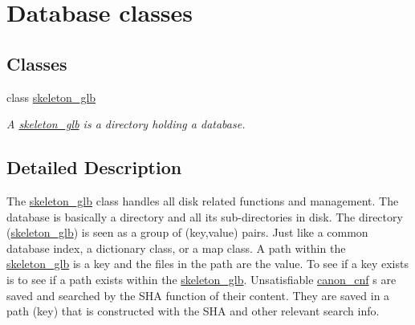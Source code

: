 \hypertarget{group__docgrp__database__classes}{}\section{Database classes}
\label{group__docgrp__database__classes}
\subsection*{Classes}
\begin{DoxyCompactItemize}
\item 
class \hyperlink{classskeleton__glb}{skeleton\+\_\+glb}
\begin{DoxyCompactList}\small\item\em A \hyperlink{classskeleton__glb}{skeleton\+\_\+glb} is a directory holding a database. \end{DoxyCompactList}\end{DoxyCompactItemize}


\subsection{Detailed Description}
The \hyperlink{classskeleton__glb}{skeleton\+\_\+glb} class handles all disk related functions and management. The database is basically a directory and all its sub-\/directories in disk. The directory (\hyperlink{classskeleton__glb}{skeleton\+\_\+glb}) is seen as a group of (\textquotesingle{}\textquotesingle{}key\textquotesingle{}\textquotesingle{},\textquotesingle{}\textquotesingle{}value\textquotesingle{}\textquotesingle{}) pairs. Just like a common database \textquotesingle{}\textquotesingle{}index\textquotesingle{}\textquotesingle{}, a \textquotesingle{}\textquotesingle{}dictionary\textquotesingle{}\textquotesingle{} class, or a \textquotesingle{}\textquotesingle{}map\textquotesingle{}\textquotesingle{} class. A path within the \hyperlink{classskeleton__glb}{skeleton\+\_\+glb} is a \textquotesingle{}\textquotesingle{}key\textquotesingle{}\textquotesingle{} and the files in the path are the \textquotesingle{}\textquotesingle{}value\textquotesingle{}\textquotesingle{}. To see if a \textquotesingle{}\textquotesingle{}key\textquotesingle{}\textquotesingle{} exists is to see if a path exists within the \hyperlink{classskeleton__glb}{skeleton\+\_\+glb}. Unsatisfiable \hyperlink{classcanon__cnf}{canon\+\_\+cnf} s are saved and searched by the S\+HA function of their content. They are saved in a path (\textquotesingle{}\textquotesingle{}key\textquotesingle{}\textquotesingle{}) that is constructed with the S\+HA and other relevant search info.

